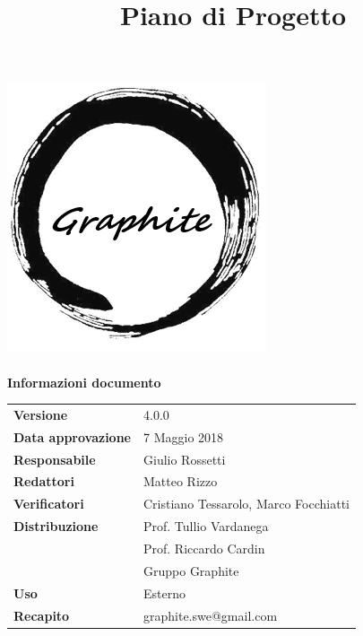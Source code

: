 \documentclass[openany,12pt,a4paper]{report}
\title{Piano di Progetto}
\author{}
\newcommand{\versione}{4.0.0}
\begin{document}
	\makeatletter
	\begin{titlepage}
		\setlength{\headsep}{0pt}  
		\begin{center}
			\includegraphics[width=0.5\linewidth]{Logo.png}\\[1em]
			{\huge \bfseries  \@title }\\[10ex]
			\textbf{\Large Informazioni documento} \\[2em]
			\bgroup
			\def\arraystretch{1.5}
			\begin{tabular}{l|l}
				\textbf{Versione} & \versione{}  \\
				\textbf{Data approvazione} & 7 Maggio 2018 \\
				\textbf{Responsabile} & Giulio Rossetti \\
				\textbf{Redattori} & Matteo Rizzo \\
				\textbf{Verificatori} & Cristiano Tessarolo, Marco Focchiatti \\
				\textbf{Distribuzione} & Prof. Tullio Vardanega \\
				 & Prof. Riccardo Cardin \\
				 & Gruppo Graphite \\
				\textbf{Uso} & Esterno \\
				\textbf{Recapito} & graphite.swe@gmail.com \\
			\end{tabular}
		\egroup
		\end{center}
	\end{titlepage}
	\makeatother

	\thispagestyle{empty}
	\newpage
	
	
	
	\tableofcontents
	\listoffigures
	\listoftables
	
	
	
	
	
	
	
\end{document}
